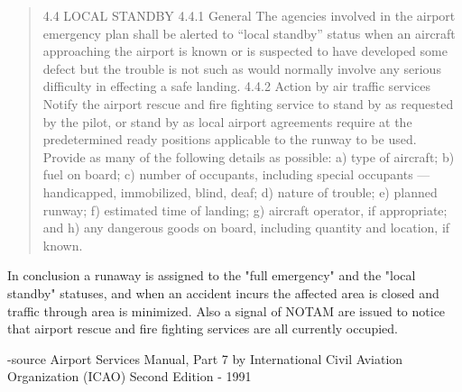 \begin{quotation}
4.4 LOCAL STANDBY
4.4.1 General
The agencies involved in the airport emergency plan shall be alerted to “local standby” status when an aircraft
approaching the airport is known or is suspected to have developed some defect but the trouble is not such as would
normally involve any serious difficulty in effecting a safe landing.
4.4.2 Action by air traffic services
Notify the airport rescue and fire fighting service to stand by as requested by the pilot, or stand by as local airport
agreements require at the predetermined ready positions applicable to the runway to be used. Provide as many of the
following details as possible:
a) type of aircraft;
b) fuel on board;
c) number of occupants, including special occupants — handicapped, immobilized, blind, deaf;
d) nature of trouble;
e) planned runway;
f) estimated time of landing;
g) aircraft operator, if appropriate; and
h) any dangerous goods on board, including quantity and location, if known.
\end{quotation}


In conclusion a runaway is assigned to the "full emergency" and the "local standby" statuses, and when an accident incurs the affected area is closed and traffic through area is minimized. Also a signal of NOTAM are issued to notice that airport rescue and fire fighting services are all currently occupied.



-source
Airport Services Manual, Part 7 by International Civil Aviation Organization (ICAO)
Second Edition - 1991


